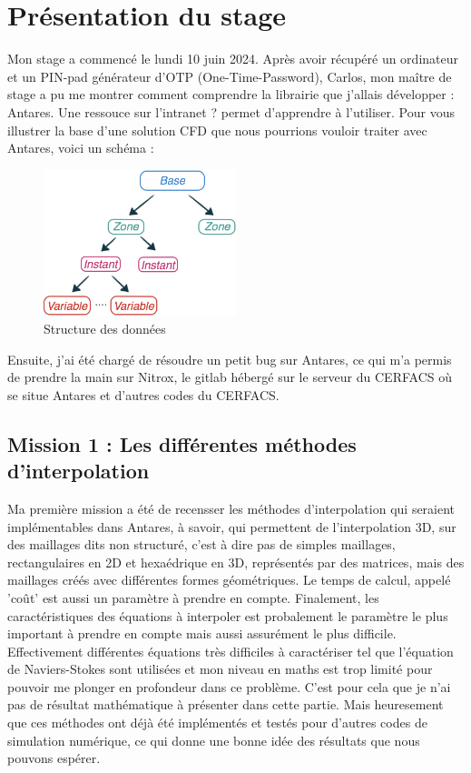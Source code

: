 \chapter{Présentation du stage}

Mon stage a commencé le lundi 10 juin 2024. Après avoir récupéré un ordinateur et un PIN-pad générateur d'OTP (One-Time-Password), Carlos, mon maître de stage a pu me montrer comment comprendre la librairie que j'allais développer : Antares. Une ressouce sur l'intranet ? permet d'apprendre à l'utiliser. Pour vous illustrer la base d'une solution CFD que nous pourrions vouloir traiter avec Antares, voici un schéma :

\begin{figure}[h!]
    \centering
    \includegraphics[width=0.5\textwidth]{images/data_structure_1.png}
    \caption{Structure des données} %
\end{figure}


Ensuite, j'ai été chargé de résoudre un petit bug sur Antares, ce qui m'a permis de prendre la main sur Nitrox, le gitlab hébergé sur le serveur du CERFACS où se situe Antares et d'autres codes du CERFACS.

\section{Mission 1 : Les différentes méthodes d'interpolation}
Ma première mission a été de recensser les méthodes d'interpolation qui seraient implémentables dans Antares, à savoir, qui permettent de l'interpolation 3D, sur des maillages dits non structuré, c'est à dire pas de simples maillages, rectangulaires en 2D et hexaédrique en 3D, représentés par des matrices, mais des maillages créés avec différentes formes géométriques.
Le temps de calcul, appelé 'coût' est aussi un paramètre à prendre en compte.
Finalement, les caractéristiques des équations à interpoler est probalement le paramètre le plus important à prendre en compte mais aussi assurément le plus difficile. Effectivement différentes équations très difficiles à caractériser tel que l'équation de Naviers-Stokes sont utilisées et mon niveau en maths est trop limité pour pouvoir me plonger en profondeur dans ce problème. C'est pour cela que je n'ai pas de résultat mathématique à présenter dans cette partie. Mais heuresement que ces méthodes ont déjà été implémentés et testés pour d'autres codes de simulation numérique, ce qui donne une bonne idée des résultats que nous pouvons espérer.

